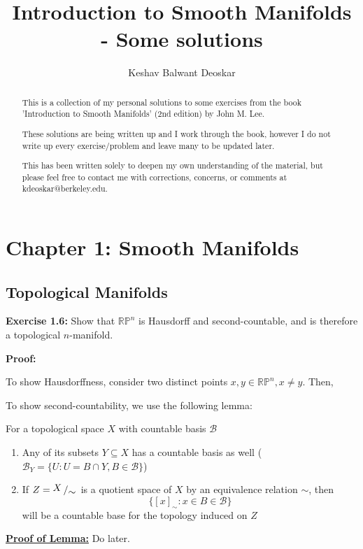 \documentclass{article}
\title{Introduction to Smooth Manifolds - Some solutions}
\author{Keshav Balwant Deoskar}
\newcommand{\bigslant}[2]{{\raisebox{.2em}{$#1$}\left/\raisebox{-.2em}{$#2$}\right.}}
\begin{document}
\maketitle

\begin{abstract}
This is a collection of my personal solutions to some exercises from the book 'Introduction to Smooth Manifolds' (2nd edition) by John M. Lee.

These solutions are being written up and I work through the book, however I do not write up every exercise/problem and leave many to be updated later.

This has been written solely to deepen my own understanding of the material, but please feel free to contact me with corrections, concerns, or comments at kdeoskar@berkeley.edu.
\end{abstract}


\tableofcontents

\pagebreak

\section{Chapter 1: Smooth Manifolds}
\vskip 0.5cm

\subsection{Topological Manifolds}

\vskip 0.5cm

\textbf{Exercise 1.6:} Show that $\mathbb{RP}^n$ is Hausdorff and second-countable, and is therefore a topological $n$-manifold. 

\vskip 0.5cm
\textbf{Proof:}

\vskip 0.5cm
To show Hausdorffness, consider two distinct points $x, y \in \mathbb{RP}^n, x \neq y$. Then, 

\vskip 0.5cm
To show second-countability, we use the following lemma:
\begin{dottedbox}
    For a topological space $X$ with countable basis $\mathcal{B}$
  \begin{enumerate}[label=(\alph*)]
    \item Any of its subsets $Y \subseteq X$ has a countable basis as well ($\mathcal{B}_Y = \{U : U = B \cap Y, B \in \mathcal{B}\}$)
    \item If $Z = \bigslant{X}{\sim}$ is a quotient space of $X$ by an equivalence relation $\sim$, then 
    \[ \{ [x]_{\sim} : x \in B \in \mathcal{B} \} \]
    will be a countable base for the topology induced on $Z$ 
\end{enumerate}
\vskip 0.5cm

\underline{\textbf{Proof of Lemma:}} Do later.
\end{dottedbox}
\end{document}
